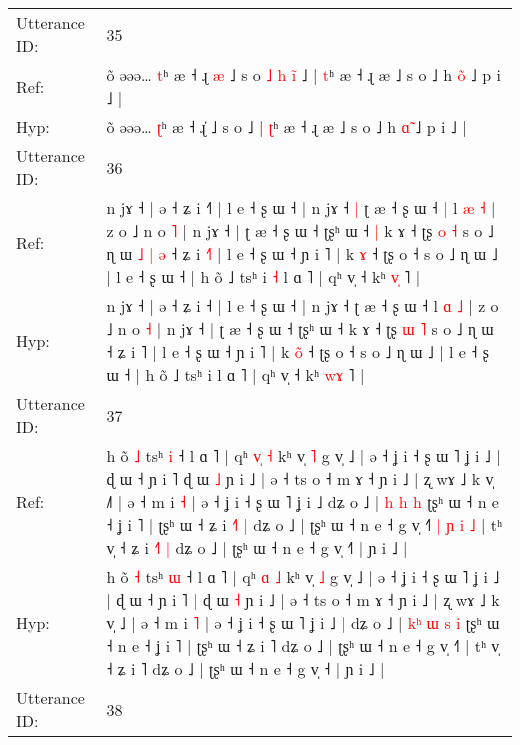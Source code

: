 \documentclass[10pt]{article}
\DeclareRobustCommand{\hl}[1]{{\textcolor{red}{#1}}}
\begin{document}
\begin{longtable}{ll}
 \\
\midrule
Utterance ID: & 35 \\
Ref: & õ əəə… \hl{t}ʰ æ ˧ ɻ\hl{ }\hl{æ} ˩ s o\hl{ }\hl{˩}\hl{ }\hl{h}\hl{ }\hl{i}\hl{̃} ˩ | \hl{t}ʰ æ ˧ ɻ æ ˩ s o ˩ h \hl{o}̃ ˩ p i ˩ |
 \\
Hyp: & õ əəə… \hl{ʈ}ʰ æ ˧ ɻ\hl{}\hl{̍} ˩ s o\hl{}\hl{}\hl{}\hl{}\hl{}\hl{}\hl{} ˩ | \hl{ʈ}ʰ æ ˧ ɻ æ ˩ s o ˩ h \hl{ɑ}̃ ˩ p i ˩ |
 \\
\midrule
Utterance ID: & 36 \\
Ref: & n jɤ ˧ | ə ˧ ʑ i ˧\hl{˥} | l e ˧ ʂ ɯ ˧ | n jɤ ˧\hl{ }\hl{|} ʈ æ ˧ ʂ ɯ ˧\hl{ }\hl{|} l \hl{æ} \hl{˧} | z o ˩ n o \hl{˥} | n jɤ ˧ | ʈ æ ˧ ʂ ɯ ˧ ʈʂʰ ɯ ˧\hl{ }\hl{|} k ɤ ˧ ʈʂ \hl{o} \hl{˧} s o ˩ ɳ ɯ\hl{ }\hl{˩}\hl{ }\hl{|}\hl{ }\hl{ə} ˧ ʑ i \hl{˧}˥ | l e ˧ ʂ ɯ ˧ ɲ i ˥ | k \hl{}\hl{ɤ} ˧ ʈʂ o ˧ s o ˩ ɳ ɯ ˩ | l e ˧ ʂ ɯ ˧ | h õ ˩ tsʰ i\hl{ }\hl{˧} l ɑ ˥ | qʰ v̩ ˧ kʰ \hl{v}\hl{̩} ˥ |
 \\
Hyp: & n jɤ ˧ | ə ˧ ʑ i ˧\hl{} | l e ˧ ʂ ɯ ˧ | n jɤ ˧\hl{}\hl{} ʈ æ ˧ ʂ ɯ ˧\hl{}\hl{} l \hl{ɑ} \hl{˩} | z o ˩ n o \hl{˧} | n jɤ ˧ | ʈ æ ˧ ʂ ɯ ˧ ʈʂʰ ɯ ˧\hl{}\hl{} k ɤ ˧ ʈʂ \hl{ɯ} \hl{˥} s o ˩ ɳ ɯ\hl{}\hl{}\hl{}\hl{}\hl{}\hl{} ˧ ʑ i \hl{}˥ | l e ˧ ʂ ɯ ˧ ɲ i ˥ | k \hl{o}\hl{̃} ˧ ʈʂ o ˧ s o ˩ ɳ ɯ ˩ | l e ˧ ʂ ɯ ˧ | h õ ˩ tsʰ i\hl{}\hl{} l ɑ ˥ | qʰ v̩ ˧ kʰ \hl{w}\hl{ɤ} ˥ |
 \\
\midrule
Utterance ID: & 37 \\
Ref: & h õ \hl{˩} tsʰ \hl{i} ˧ l ɑ ˥ | qʰ \hl{v}\hl{̩} \hl{˧} kʰ v̩ \hl{˥} g v̩ ˩ | ə ˧ ʝ i ˧ ʂ ɯ ˥ ʝ i ˩ | ɖ ɯ ˧ ɲ i ˥\hl{}\hl{} ɖ ɯ \hl{˩} ɲ i ˩ | ə ˧ ts o ˧ m ɤ ˧ ɲ i ˩ | ʐ wɤ ˩ k v̩ ˩\hl{˥} | ə ˧ m i \hl{˧} | ə ˧ ʝ i ˧ ʂ ɯ ˥ ʝ i ˩\hl{}\hl{} dʑ o ˩ |\hl{}\hl{}\hl{} \hl{h} \hl{h} \hl{h} ʈʂʰ ɯ ˧ n e ˧ ʝ i ˥ | ʈʂʰ ɯ ˧ ʑ i \hl{˧}˥\hl{ }\hl{|} dʑ o ˩ | ʈʂʰ ɯ ˧ n e ˧ g v̩ ˧˥\hl{ }\hl{|}\hl{ }\hl{ɲ}\hl{ }\hl{i}\hl{ }\hl{˩} | tʰ v̩ ˧ ʑ i \hl{˧}˥\hl{ }\hl{|} dʑ o ˩ | ʈʂʰ ɯ ˧ n e ˧ g v̩ ˧\hl{˥} | ɲ i ˩ |
 \\
Hyp: & h õ \hl{˧} tsʰ \hl{ɯ} ˧ l ɑ ˥ | qʰ \hl{}\hl{ɑ} \hl{˩} kʰ v̩ \hl{˩} g v̩ ˩ | ə ˧ ʝ i ˧ ʂ ɯ ˥ ʝ i ˩ | ɖ ɯ ˧ ɲ i ˥\hl{ }\hl{|} ɖ ɯ \hl{˧} ɲ i ˩ | ə ˧ ts o ˧ m ɤ ˧ ɲ i ˩ | ʐ wɤ ˩ k v̩ ˩\hl{} | ə ˧ m i \hl{˥} | ə ˧ ʝ i ˧ ʂ ɯ ˥ ʝ i ˩\hl{ }\hl{|} dʑ o ˩ |\hl{ }\hl{k}\hl{ʰ} \hl{ɯ} \hl{s} \hl{i} ʈʂʰ ɯ ˧ n e ˧ ʝ i ˥ | ʈʂʰ ɯ ˧ ʑ i \hl{}˥\hl{}\hl{} dʑ o ˩ | ʈʂʰ ɯ ˧ n e ˧ g v̩ ˧˥\hl{}\hl{}\hl{}\hl{}\hl{}\hl{}\hl{}\hl{} | tʰ v̩ ˧ ʑ i \hl{}˥\hl{}\hl{} dʑ o ˩ | ʈʂʰ ɯ ˧ n e ˧ g v̩ ˧\hl{} | ɲ i ˩ |
 \\
\midrule
Utterance ID: & 38 \\

\end{longtable}
\end{document}
